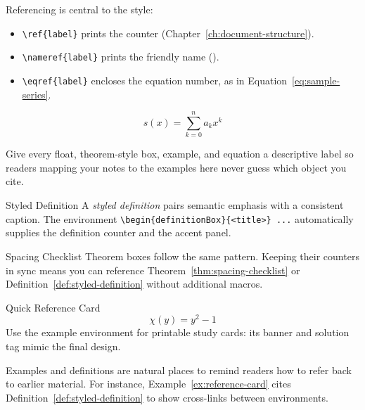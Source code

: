 \label{sec:core-references}

Referencing is central to the style:

\begin{itemize}[leftmargin=1.8em]
  \item \verb|\ref{label}| prints the counter (Chapter~\ref{ch:document-structure}).
  \item \verb|\nameref{label}| prints the friendly name ().
  \item \verb|\eqref{label}| encloses the equation number, as in
        Equation~\eqref{eq:sample-series}.
\end{itemize}

\begin{equation}
  \label{eq:sample-series}
  s(x) = \sum_{k=0}^{n} a_k x^k
\end{equation}

Give every float, theorem-style box, example, and equation a descriptive label so
readers mapping your notes to the examples here never guess which object you cite.

\label{sec:definition-demo}

\begin{definitionBox}{Styled Definition}
\label{def:styled-definition}
A \emph{styled definition} pairs semantic emphasis with a consistent caption. The
environment \verb|\begin{definitionBox}{<title>} ...| automatically supplies the
definition counter and the accent panel.
\end{definitionBox}

\begin{theoremBox}{Spacing Checklist}
\label{thm:spacing-checklist}
Theorem boxes follow the same pattern. Keeping their counters in sync means you can
reference Theorem~\ref{thm:spacing-checklist} or Definition~\ref{def:styled-definition}
without additional macros.
\end{theoremBox}

\begin{textexample}{Quick Reference Card}
\label{ex:reference-card}
\[
  \chi(y) = y^2 - 1
\]
\solutiontag\; Use the example environment for printable study cards: its banner and
solution tag mimic the final design.
\end{textexample}

Examples and definitions are natural places to remind readers how to refer back to
earlier material. For instance, Example~\ref{ex:reference-card} cites
Definition~\ref{def:styled-definition} to show cross-links between environments.
